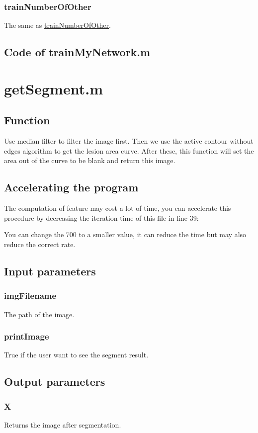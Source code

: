 \documentclass[14pt]{report} %
\begin{document}
\subsubsection{trainNumberOfOther}
	The same as  \hyperref[par:trainNumberOfOther]{trainNumberOfOther}.
\clearpage
\subsection{Code of trainMyNetwork.m}


\clearpage
\section{getSegment.m}
\label{section:getSegment.m}
\subsection{Function}
	Use median filter to filter the image first. Then we use the active contour without edges algorithm to get the lesion area curve. After these, this function will set the area out of the curve to be blank and return this image.
\subsection{Accelerating the program}
\label{subsection:Accelerating the program2}
	The computation of feature may cost a lot of time, you can accelerate this procedure by decreasing the iteration time of this file in line 39:
	
	You can change the 700 to a smaller value, it can reduce  the time but may also reduce the correct rate.
\subsection{Input parameters}
\subsubsection{imgFilename}
	The path of the image.
\subsubsection{printImage}
	True if the user want to see the segment result. 
\subsection{Output parameters}
\subsubsection{X}
	Returns the image after segmentation.
\end{document}
